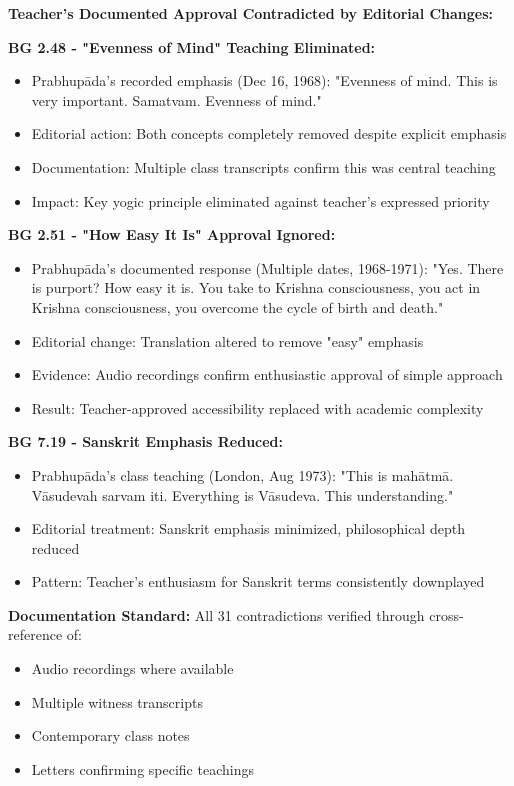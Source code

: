 \documentclass[11pt,twoside]{book}
\begin{document}
\textbf{\textbf{Teacher's Documented Approval Contradicted by Editorial Changes:}}

\textbf{\textbf{BG 2.48 - "Evenness of Mind" Teaching Eliminated:}}
\begin{itemize}
\item Prabhupāda's recorded emphasis (Dec 16, 1968): "Evenness of mind. This is very important. Samatvam. Evenness of mind."
\item Editorial action: Both concepts completely removed despite explicit emphasis
\item Documentation: Multiple class transcripts confirm this was central teaching
\item Impact: Key yogic principle eliminated against teacher's expressed priority
\end{itemize}

\textbf{\textbf{BG 2.51 - "How Easy It Is" Approval Ignored:}}
\begin{itemize}
\item Prabhupāda's documented response (Multiple dates, 1968-1971): "Yes. There is purport? How easy it is. You take to Krishna consciousness, you act in Krishna consciousness, you overcome the cycle of birth and death."
\item Editorial change: Translation altered to remove "easy" emphasis
\item Evidence: Audio recordings confirm enthusiastic approval of simple approach
\item Result: Teacher-approved accessibility replaced with academic complexity
\end{itemize}

\textbf{\textbf{BG 7.19 - Sanskrit Emphasis Reduced:}}
\begin{itemize}
\item Prabhupāda's class teaching (London, Aug 1973): "This is mahātmā. Vāsudevah sarvam iti. Everything is Vāsudeva. This understanding."
\item Editorial treatment: Sanskrit emphasis minimized, philosophical depth reduced
\item Pattern: Teacher's enthusiasm for Sanskrit terms consistently downplayed
\end{itemize}

\textbf{\textbf{Documentation Standard:}}
All 31 contradictions verified through cross-reference of:
\begin{itemize}
\item Audio recordings where available
\item Multiple witness transcripts
\item Contemporary class notes
\item Letters confirming specific teachings
\end{itemize}
\end{document}

